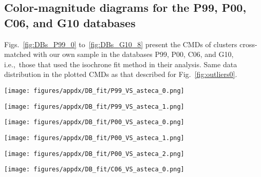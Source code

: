 \documentclass{aa}
\begin{document}
\begin{appendix}
\section{Color-magnitude diagrams for the P99, P00, C06, and G10 databases}
\label{apdx:databases}

Figs.~\ref{fig:DBs_P99_0} to~\ref{fig:DBs_G10_8} present the CMDs of clusters
cross-matched with our own sample in the databases P99, P00, C06, and G10,
i.e.,\ those that used the isochrone fit method in their analysis.
%
Same data distribution in the plotted CMDs as that described for
Fig.~\ref{fig:outliers0}.

\begin{figure*}
\texttt{[image: figures/appdx/DB\_fit/P99\_VS\_asteca\_0.png]}
\caption{CMDs for the P99 database.}
\label{fig:DBs_P99_0}
\end{figure*}
\clearpage

\begin{figure*}
\texttt{[image: figures/appdx/DB\_fit/P99\_VS\_asteca\_1.png]}
\caption{CMDs for the P99 database.}
\label{fig:DBs_P99_1}
\end{figure*}
\clearpage

\begin{figure*}
\texttt{[image: figures/appdx/DB\_fit/P00\_VS\_asteca\_0.png]}
\caption{CMDs for the P00 database.}
\label{fig:DBs_P00_0}
\end{figure*}
\clearpage

\begin{figure*}
\texttt{[image: figures/appdx/DB\_fit/P00\_VS\_asteca\_1.png]}
\caption{CMDs for the P00 database.}
\label{fig:DBs_P00_1}
\end{figure*}
\clearpage

\begin{figure*}
\texttt{[image: figures/appdx/DB\_fit/P00\_VS\_asteca\_2.png]}
\caption{CMDs for the P00 database.}
\label{fig:DBs_P00_2}
\end{figure*}
\clearpage

\begin{figure*}
\texttt{[image: figures/appdx/DB\_fit/C06\_VS\_asteca\_0.png]}
\caption{CMDs for the C06 database.}
\label{fig:DBs_C06_0}
\end{figure*}
\clearpage


\end{appendix}
\end{document}
